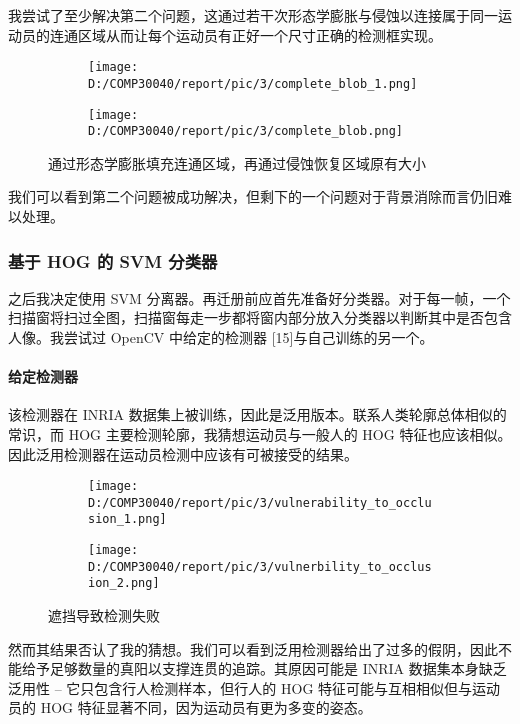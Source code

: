 \documentclass{article}
\begin{document}
我尝试了至少解决第二个问题，这通过若干次形态学膨胀与侵蚀以连接属于同一运动员的连通区域从而让每个运动员有正好一个尺寸正确的检测框实现。\\
\begin{figure}[h!]
  \begin{subfigure}[b]{\linewidth}
  \centering
    \texttt{[image: D:/COMP30040/report/pic/3/complete\_blob\_1.png]} 
  \end{subfigure}
  \begin{subfigure}[b]{\linewidth}
  \centering
    \texttt{[image: D:/COMP30040/report/pic/3/complete\_blob.png]} 
  \end{subfigure}
  \caption{通过形态学膨胀填充连通区域，再通过侵蚀恢复区域原有大小}
\end{figure}
我们可以看到第二个问题被成功解决，但剩下的一个问题对于背景消除而言仍旧难以处理。
\subsubsection{基于 HOG 的 SVM 分类器}
之后我决定使用 SVM 分离器。再迁册前应首先准备好分类器。对于每一帧，一个扫描窗将扫过全图，扫描窗每走一步都将窗内部分放入分类器以判断其中是否包含人像。我尝试过 OpenCV 中给定的检测器 [15]与自己训练的另一个。
\paragraph{给定检测器}
该检测器在 INRIA 数据集上被训练，因此是泛用版本。联系人类轮廓总体相似的常识，而 HOG 主要检测轮廓，我猜想运动员与一般人的 HOG 特征也应该相似。因此泛用检测器在运动员检测中应该有可被接受的结果。\\
\begin{figure}[h!]
  \centering
  \begin{subfigure}[b]{0.4\linewidth}
    \texttt{[image: D:/COMP30040/report/pic/3/vulnerability\_to\_occlusion\_1.png]} 
  \end{subfigure}\hspace{5mm}
  \begin{subfigure}[b]{0.4\linewidth}
    \texttt{[image: D:/COMP30040/report/pic/3/vulnerbility\_to\_occlusion\_2.png]} 
  \end{subfigure}
  \caption{遮挡导致检测失败}
\end{figure}
然而其结果否认了我的猜想。我们可以看到泛用检测器给出了过多的假阴，因此不能给予足够数量的真阳以支撑连贯的追踪。其原因可能是 INRIA 数据集本身缺乏泛用性 -- 它只包含行人检测样本，但行人的 HOG 特征可能与互相相似但与运动员的 HOG 特征显著不同，因为运动员有更为多变的姿态。\\
\end{document}
